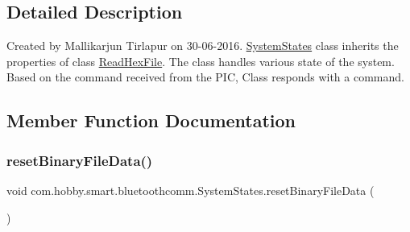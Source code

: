 \subsection{Detailed Description}
Created by Mallikarjun Tirlapur on 30-\/06-\/2016. \hyperlink{classcom_1_1hobby_1_1smart_1_1bluetoothcomm_1_1_system_states}{System\+States} class inherits the properties of class \hyperlink{classcom_1_1hobby_1_1smart_1_1bluetoothcomm_1_1_read_hex_file}{Read\+Hex\+File}. The class handles various state of the system. Based on the command received from the P\+IC, Class responds with a command. 

\subsection{Member Function Documentation}
\mbox{\label{classcom_1_1hobby_1_1smart_1_1bluetoothcomm_1_1_system_states_a87fb0e57edebde31af07339fcb5f7300}} 
\subsubsection{\texorpdfstring{reset\+Binary\+File\+Data()}{resetBinaryFileData()}}
{\footnotesize\ttfamily void com.\+hobby.\+smart.\+bluetoothcomm.\+System\+States.\+reset\+Binary\+File\+Data (\begin{DoxyParamCaption}{ }\end{DoxyParamCaption})}

